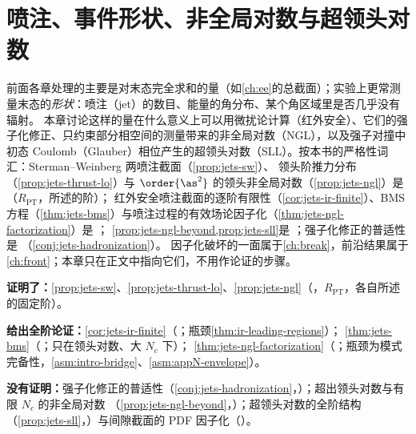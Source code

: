 \chapter{喷注、事件形状、非全局对数与超领头对数}\label{ch:jets}

前面各章处理的主要是对末态完全求和的量（如\cref{ch:ee}的总截面）；实验上更常测量末态的\emph{形状}：喷注（jet）的数目、能量的角分布、某个角区域里是否几乎没有辐射。
本章讨论这样的量在什么意义上可以用微扰论计算（红外安全）、它们的强子化修正、只约束部分相空间的测量带来的非全局对数（NGL），以及强子对撞中初态 Coulomb（Glauber）相位产生的超领头对数（SLL）。按本书的严格性词汇：Sterman--Weinberg 两喷注截面（\cref{prop:jets-sw}）、
领头阶推力分布（\cref{prop:jets-thrust-lo}）与 $\order{\as^2}$ 的领头非全局对数（\cref{prop:jets-ngl}）是 \tagR（$R_{\mathrm{PT}}$，所述的阶）；
红外安全喷注截面的逐阶有限性（\cref{cor:jets-ir-finite}）、BMS 方程（\cref{thm:jets-bms}）与喷注过程的有效场论因子化（\cref{thm:jets-ngl-factorization}）是 \tagA；
\cref{prop:jets-ngl-beyond,prop:jets-sll}是 \tagP；强子化修正的普适性是 \tagC（\cref{conj:jets-hadronization}）。
因子化破坏的一面属于\cref{ch:break}，前沿结果属于\cref{ch:front}；本章只在正文中指向它们，不用作论证的步骤。

\begin{tcolorbox}[enhanced,breakable,title=本章证明了什么／没有证明什么,fonttitle=\bfseries,
  colback=gray!3!white,colframe=gray!55!black,boxrule=0.6pt,arc=2pt,
  left=5pt,right=5pt,top=3pt,bottom=3pt,before skip=6pt,after skip=6pt]
\textbf{证明了：}\cref{prop:jets-sw}、\cref{prop:jets-thrust-lo}、\cref{prop:jets-ngl}（\tagR，$R_{\mathrm{PT}}$，各自所述的固定阶）。\par
\textbf{给出全阶论证：}\cref{cor:jets-ir-finite}（\tagA；瓶颈\cref{thm:ir-leading-regions}）；
\cref{thm:jets-bms}（\tagA；只在领头对数、大 $N_c$ 下）；
\cref{thm:jets-ngl-factorization}（\tagA；瓶颈为模式完备性，\cref{asm:intro-bridge}、\cref{asm:appN-envelope}）。\par
\textbf{没有证明：}强子化修正的普适性（\cref{conj:jets-hadronization}，\tagC）；超出领头对数与有限 $N_c$ 的非全局对数
（\cref{prop:jets-ngl-beyond}，\tagP）；超领头对数的全阶结构（\cref{prop:jets-sll}，\tagP）与间隙截面的 PDF 因子化（\tagC）。
\end{tcolorbox}

